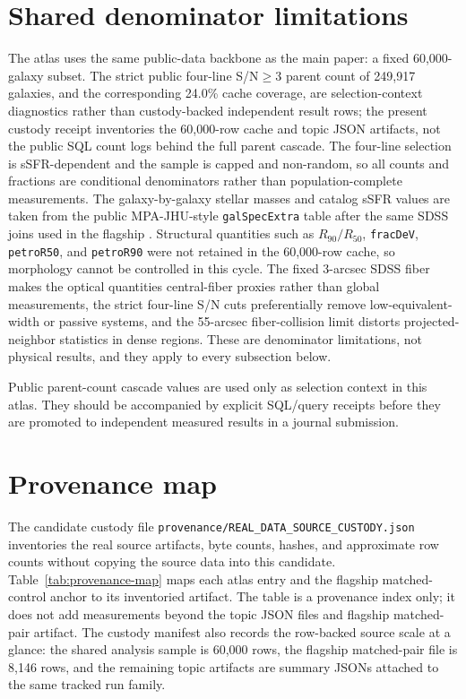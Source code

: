 \documentclass[twocolumn]{aastex631}
\begin{document}
\section{Shared denominator limitations}
The atlas uses the same public-data backbone as the main paper: a fixed 60,000-galaxy subset. The strict public four-line S/N$\geq3$ parent count of 249,917 galaxies, and the corresponding 24.0\% cache coverage, are selection-context diagnostics rather than custody-backed independent result rows; the present custody receipt inventories the 60,000-row cache and topic JSON artifacts, not the public SQL count logs behind the full parent cascade. The four-line selection is sSFR-dependent and the sample is capped and non-random, so all counts and fractions are conditional denominators rather than population-complete measurements. The galaxy-by-galaxy stellar masses and catalog sSFR values are taken from the public MPA-JHU-style \texttt{galSpecExtra} table after the same SDSS joins used in the flagship \citep{sdssdr17,brinchmann2004,york2000}. Structural quantities such as \(R_{90}/R_{50}\), \texttt{fracDeV}, \texttt{petroR50}, and \texttt{petroR90} were not retained in the 60,000-row cache, so morphology cannot be controlled in this cycle. The fixed 3-arcsec SDSS fiber makes the optical quantities central-fiber proxies rather than global measurements, the strict four-line S/N cuts preferentially remove low-equivalent-width or passive systems, and the 55-arcsec fiber-collision limit distorts projected-neighbor statistics in dense regions. These are denominator limitations, not physical results, and they apply to every subsection below.

Public parent-count cascade values are used only as selection context in this atlas. They should be accompanied by explicit SQL/query receipts before they are promoted to independent measured results in a journal submission.

\section{Provenance map}
The candidate custody file \texttt{provenance/REAL\_DATA\_SOURCE\_CUSTODY.json} inventories the real source artifacts, byte counts, hashes, and approximate row counts without copying the source data into this candidate. Table~\ref{tab:provenance-map} maps each atlas entry and the flagship matched-control anchor to its inventoried artifact. The table is a provenance index only; it does not add measurements beyond the topic JSON files and flagship matched-pair artifact.
The custody manifest also records the row-backed source scale at a glance: the shared analysis sample is 60,000 rows, the flagship matched-pair file is 8,146 rows, and the remaining topic artifacts are summary JSONs attached to the same tracked run family.
\end{document}
